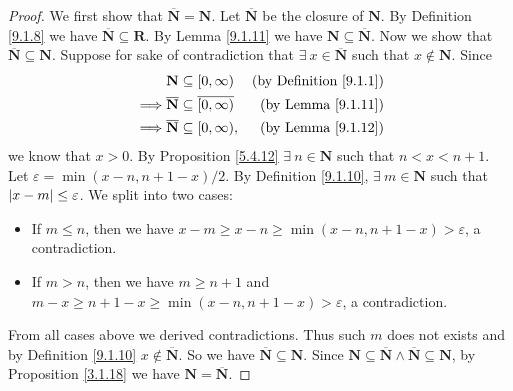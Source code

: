 \begin{proof}
    We first show that \(\overline{\mathbf{N}} = \mathbf{N}\).
    Let \(\overline{\mathbf{N}}\) be the closure of \(\mathbf{N}\).
    By Definition \ref{9.1.8} we have \(\overline{\mathbf{N}} \subseteq \mathbf{R}\).
    By Lemma \ref{9.1.11} we have \(\mathbf{N} \subseteq \overline{\mathbf{N}}\).
    Now we show that \(\overline{\mathbf{N}} \subseteq \mathbf{N}\).
    Suppose for sake of contradiction that \(\exists\ x \in \overline{\mathbf{N}}\) such that \(x \notin \mathbf{N}\).
    Since
    \begin{align*}
                 & \mathbf{N} \subseteq [0, \infty)                       & \text{(by Definition \ref{9.1.1})} \\
        \implies & \overline{\mathbf{N}} \subseteq \overline{[0, \infty)} & \text{(by Lemma \ref{9.1.11})}     \\
        \implies & \overline{\mathbf{N}} \subseteq [0, \infty),           & \text{(by Lemma \ref{9.1.12})}
    \end{align*}
    we know that \(x > 0\).
    By Proposition \ref{5.4.12} \(\exists\ n \in \mathbf{N}\) such that \(n < x < n + 1\).
    Let \(\varepsilon = \min(x - n, n + 1 - x) / 2\).
    By Definition \ref{9.1.10}, \(\exists\ m \in \mathbf{N}\) such that \(\abs*{x - m} \leq \varepsilon\).
    We split into two cases:
    \begin{itemize}
        \item If \(m \leq n\), then we have \(x - m \geq x - n \geq \min(x - n, n + 1 - x) > \varepsilon\), a contradiction.
        \item If \(m > n\), then we have \(m \geq n + 1\) and \(m - x \geq n + 1 - x \geq \min(x - n, n + 1 - x) > \varepsilon\), a contradiction.
    \end{itemize}
    From all cases above we derived contradictions.
    Thus such \(m\) does not exists and by Definition \ref{9.1.10} \(x \notin \overline{\mathbf{N}}\).
    So we have \(\overline{\mathbf{N}} \subseteq \mathbf{N}\).
    Since \(\mathbf{N} \subseteq \overline{\mathbf{N}} \land \overline{\mathbf{N}} \subseteq \mathbf{N}\), by Proposition \ref{3.1.18} we have \(\mathbf{N} = \overline{\mathbf{N}}\).


\end{proof}
